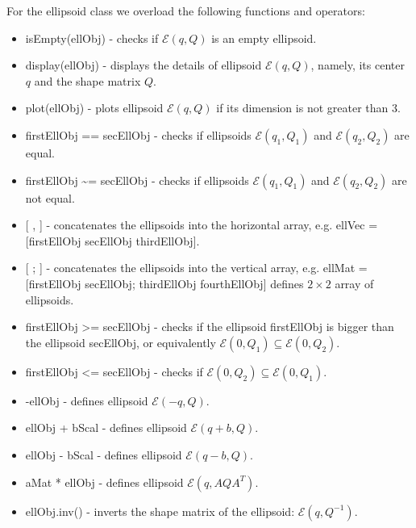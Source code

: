\documentclass[letterpaper,10pt,english]{sphinxmanual}
\begin{document}
For the ellipsoid class we overload the following functions and
operators:
\begin{itemize}
\item {} 
isEmpty(ellObj) - checks if ${\mathcal E}(q,Q)$ is an empty
ellipsoid.

\item {} 
display(ellObj) - displays the details of ellipsoid
${\mathcal E}(q,Q)$, namely, its center $q$ and the shape
matrix $Q$.

\item {} 
plot(ellObj) - plots ellipsoid ${\mathcal E}(q,Q)$ if its
dimension is not greater than 3.

\item {} 
firstEllObj == secEllObj - checks if ellipsoids
${\mathcal E}(q_1,Q_1)$ and ${\mathcal E}(q_2,Q_2)$ are
equal.

\item {} 
firstEllObj \textasciitilde{}= secEllObj - checks if ellipsoids
${\mathcal E}(q_1,Q_1)$ and ${\mathcal E}(q_2,Q_2)$ are
not equal.

\item {} 
{[} , {]} - concatenates the ellipsoids into the horizontal array, e.g. ellVec
= {[}firstEllObj secEllObj thirdEllObj{]}.

\item {} 
{[} ; {]} - concatenates the ellipsoids into the vertical array, e.g. ellMat =
{[}firstEllObj secEllObj; thirdEllObj fourthEllObj{]} defines
$2\times 2$ array of ellipsoids.

\item {} 
firstEllObj \textgreater{}= secEllObj - checks if the ellipsoid firstEllObj is
bigger than the ellipsoid secEllObj, or equivalently
${\mathcal E}(0,Q_1)\subseteq{\mathcal E}(0,Q_2)$.

\item {} 
firstEllObj \textless{}= secEllObj - checks if
${\mathcal E}(0,Q_2)\subseteq{\mathcal E}(0,Q_1)$.

\item {} 
-ellObj - defines ellipsoid ${\mathcal E}(-q,Q)$.

\item {} 
ellObj + bScal - defines ellipsoid ${\mathcal E}(q+b,Q)$.

\item {} 
ellObj - bScal - defines ellipsoid ${\mathcal E}(q-b,Q)$.

\item {} 
aMat * ellObj - defines ellipsoid ${\mathcal E}(q,AQA^T)$.

\item {} 
ellObj.inv() - inverts the shape matrix of the ellipsoid:
${\mathcal E}(q,Q^{-1})$.

\end{itemize}
\end{document}
